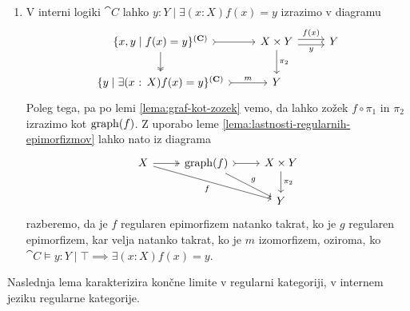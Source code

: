 \documentclass[../kategoricna_logika.tex]{subfiles}
\begin{document}
\begin{dokaz}
\begin{enumerate}[label=(\roman*)]
    \item V interni logiki $\cat{C}$ lahko $y:Y \mid \exists (x:X) f(x) = y$
      izrazimo v diagramu
      \begin{equation*}
        \begin{tikzcd}
          \{x,y \mid f(x) = y\}^{(\cat{C})} \ar[r, tail] \ar[d, two heads] & X \times Y \ar[r, shift left, "f(x)"] \ar[r, shift right, "y"'] \ar[d, "\pi_2"] & Y \\
          \{y \mid \exists (x\text{ : }X) f(x) = y\}^{(\cat{C})} \ar[r, tail, "m"] & Y
        \end{tikzcd}
      \end{equation*}
      Poleg tega, pa po lemi \ref{lema:graf-kot-zozek} vemo, da lahko
      zožek $f \circ \pi_1$ in $\pi_2$ izrazimo kot $\operatorname{graph}(f)$.  Z
      uporabo leme \ref{lema:lastnosti-regularnih-epimorfizmov} lahko
      nato iz diagrama
      \begin{equation*}
        \begin{tikzcd}
          X \ar[drr, "f"'] \ar[r, two heads] & \operatorname{graph}(f) \ar[dr, "g"] \ar[r, tail] & X \times Y \ar[d, "\pi_2"] \\
          & & Y
        \end{tikzcd}
      \end{equation*}
      razberemo, da je $f$ regularen epimorfizem natanko takrat, ko je
      $g$ regularen epimorfizem, kar velja natanko takrat, ko je $m$
      izomorfizem, oziroma, ko
      $\cat{C} \models y:Y \mid \top \implies \exists (x:X) f(x) = y$.\qedhere
    \end{enumerate}
  \end{dokaz}
  Naslednja lema karakterizira končne limite v regularni kategoriji, v
  internem jeziku regularne kategorije.
\end{document}
